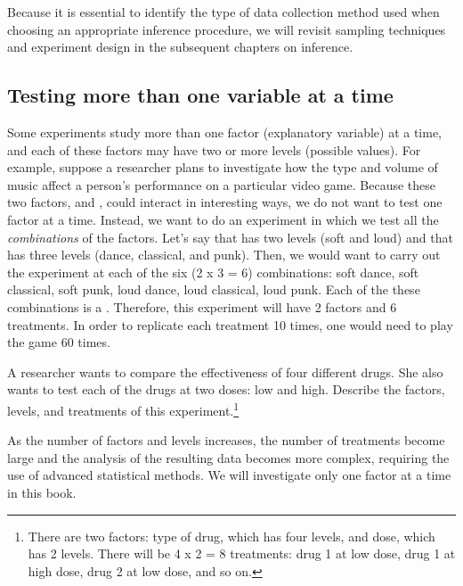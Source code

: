 Because it is essential to identify the type of data collection method used when choosing an appropriate inference procedure, we will revisit sampling techniques and experiment design in the subsequent chapters on inference.



\subsection{Testing more than one variable at a time}


Some experiments study more than one factor (explanatory variable) at a time, and each of these factors may have two or more levels (possible values). For example, suppose a researcher plans to investigate how the type and volume of music affect a person's performance on a particular video game. Because these two factors,  and , could interact in interesting ways, we do not want to test one factor at a time. %
Instead, we want to do an experiment in which
we test all the \emph{combinations} of the factors. Let's say that  has two levels (soft and loud) and that  has three levels (dance, classical, and punk). Then, we would want to carry out the experiment at each of the six (2 x 3 = 6) combinations: soft dance, soft classical, soft punk, loud dance, loud classical, loud punk. Each of the these combinations is a . Therefore, this experiment will have 2 factors and 6 treatments. In order to replicate each treatment 10 times, one would need to play the game 60 times.

\begin{exercise}A researcher wants to compare the effectiveness of four different drugs. She also wants to test each of the drugs at two doses: low and high. Describe the factors, levels, and treatments of this experiment.\footnote{There are two factors: type of drug, which has four levels, and dose, which has 2 levels. There will be 4 x 2 = 8 treatments: drug 1 at low dose, drug 1 at high dose, drug 2 at low dose, and so on.}
\end{exercise}

As the number of factors and levels increases, the number of treatments become large and the analysis of the resulting data becomes more complex, requiring the use of advanced statistical methods. We will investigate only one factor at a time in this book.

